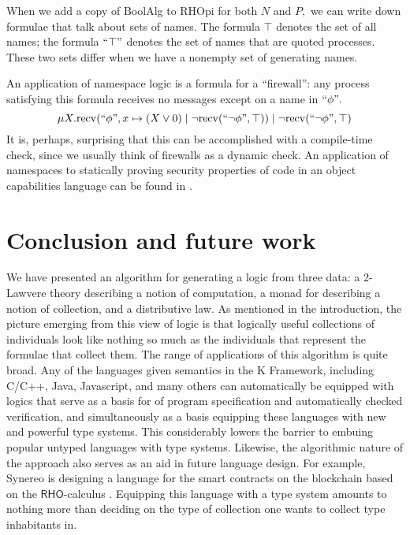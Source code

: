 \documentclass{llncs}
\renewcommand{\:}{\colon}
\newcommand{\recv}{\mathrm{recv}}
\renewcommand{\quote}[1]{``#1"}
\begin{document}
When we add a copy of BoolAlg to RHOpi for both $N$ and $P,$ we can write down formulae that talk about sets of names.  The formula $\top$ denotes the set of all names; the formula $\quote{\top}$ denotes the set of names that are quoted processes.  These two sets differ when we have a nonempty set of generating names.

An application of namespace logic is a formula for a ``firewall'': any process satisfying this formula receives no messages except on a name in $\quote{\phi}.$
\[ \mu X. \recv(\quote{\phi}, x \mapsto (X \lor 0)\;|\;\neg\recv(\quote{\neg \phi}, \top))\;|\;\neg\recv(\quote{\neg \phi}, \top) \]
It is, perhaps, surprising that this can be accomplished with a compile-time check, since we usually think of firewalls as a dynamic check.  An application of namespaces to statically proving security properties of code in an object capabilities language can be found in \cite{DBLP:journals/corr/MeredithSD13}.

\section{Conclusion and future work}
We have presented an algorithm for generating a logic from three data:
a 2-Lawvere theory describing a notion of computation, a monad for
describing a notion of collection, and a distributive law. As
mentioned in the introduction, the picture emerging from this view of
logic is that logically useful collections of individuals look like
nothing so much as the individuals that represent the formulae that
collect them.  The range of applications of this algorithm is quite
broad.  Any of the languages given semantics in the K Framework,
including C/C++, Java, Javascript, and many others can automatically
be equipped with logics that serve as a basis for of program
specification and automatically checked verification, and
simultaneously as a basis equipping these languages with new and
powerful type systems.  This considerably lowers the barrier to
embuing popular untyped languages with type systems.  Likewise, the
algorithmic nature of the approach also serves as an aid in future
language design.  For example, Synereo is designing a language for the
smart contracts on the blockchain based on the
$\mathsf{RHO}$-calculus \cite{rholang}.  Equipping this language with a type system
amounts to nothing more than deciding on the type of collection one
wants to collect type inhabitants in.



\end{document}
